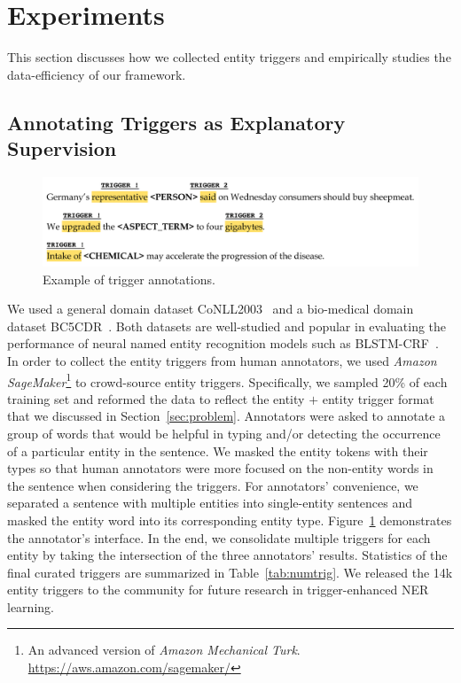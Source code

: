 \section{Experiments}
\label{sec:exp}
This section discusses how we collected entity triggers and empirically studies the data-efficiency of our framework.
\subsection{Annotating Triggers as Explanatory Supervision}
\label{sec:trigger}

\begin{figure}[h] %
	\centering
	\includegraphics[width=0.9\linewidth]{LatexDiss/figures/triggers.pdf}
	\caption{Example of trigger annotations.}
	\label{fig:triggerannotation}
\end{figure}

We used a general domain dataset CoNLL2003~\citep{conll} and a bio-medical domain dataset BC5CDR~\citep{bc5cdr}.
Both datasets are well-studied and popular in evaluating the performance of neural named entity recognition models such as BLSTM-CRF~\citep{DBLP:conf/acl/MaH16}.
In order to collect the entity triggers from human annotators, 
we used \textit{Amazon SageMaker}\footnote{An advanced version of \textit{Amazon Mechanical Turk}. \url{https://aws.amazon.com/sagemaker/}} to crowd-source entity triggers.
Specifically, we sampled 20\% of each training set and reformed the data to reflect the entity $+$ entity trigger format that we discussed in Section~\ref{sec:problem}.
Annotators were asked to annotate a group of words that would be helpful in typing and/or detecting the occurrence of a particular entity in the sentence.
We masked the entity tokens with their types so that human annotators were more focused on the non-entity words in the sentence when considering the triggers.
For annotators' convenience, we separated a sentence with multiple entities into single-entity sentences and masked the entity word into its corresponding entity type. Figure~\ref{fig:triggerannotation} demonstrates the annotator's interface.
In the end, we consolidate multiple triggers for each entity by taking the intersection of the three annotators' results. 
Statistics of the final curated triggers are summarized in Table~\ref{tab:numtrig}.
We released the 14k entity triggers to the community for future research in trigger-enhanced NER learning. %

